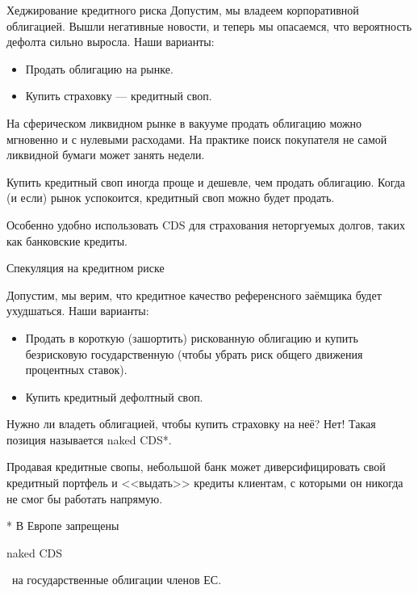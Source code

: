 \documentclass{beamer}
\newcommand{\en}[1]{\begin{otherlanguage}{english}#1\end{otherlanguage}}
\begin{document}
\begin{frame}{Хеджирование кредитного риска}
\justify
Допустим, мы владеем корпоративной облигацией. Вышли негативные новости, и теперь мы опасаемся, что вероятность дефолта сильно выросла. Наши варианты:
\begin{itemize}
\item Продать облигацию на рынке.
\item Купить страховку --- кредитный своп.
\end{itemize}

\justify
На сферическом ликвидном рынке в вакууме продать облигацию можно мгновенно и с нулевыми расходами. На практике поиск покупателя не самой ликвидной бумаги может занять недели.

\justify
Купить кредитный своп иногда проще и дешевле, чем продать облигацию. Когда (и если) рынок успокоится, кредитный своп можно будет продать.

\justify
Особенно удобно использовать CDS для страхования неторгуемых долгов, таких как банковские кредиты.
\end{frame}



\begin{frame}{Спекуляция на кредитном риске}

\justify
Допустим, мы верим, что кредитное качество референсного заёмщика будет ухудшаться. Наши варианты:
\begin{itemize}
\justifying
\item Продать в короткую (зашортить) рискованную облигацию и купить безрисковую государственную (чтобы убрать риск общего движения процентных ставок).
\item Купить кредитный дефолтный своп.
\end{itemize}

\justify
Нужно ли владеть облигацией, чтобы купить страховку на неё? Нет! Такая позиция называется naked CDS*.

\justify
Продавая кредитные свопы, небольшой банк может диверсифицировать свой кредитный 
портфель и <<выдать>> кредиты клиентам, с которыми он никогда не смог бы работать
напрямую.

\justify
* В Европе запрещены \en{naked CDS}\ на государственные облигации членов ЕС.
\end{frame}


\renewcommand{\swapPartyNode}[4]{

	\draw (#1, #2)
		node[
			rectangle,
			draw,
			rounded corners,
			anchor = south,
			minimum height = 0.8cm,
			minimum width = 2.8cm
		]
		(#4)
		{#3};
}
\end{document}
